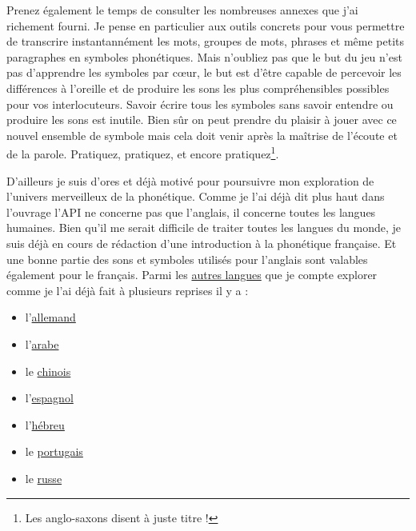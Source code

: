 Prenez également le temps de consulter les nombreuses annexes que j'ai
richement fourni. Je pense en particulier aux outils concrets pour
vous permettre de transcrire instantannément les mots, groupes de
mots, phrases et même petits paragraphes en symboles phonétiques. Mais
n'oubliez pas que le but du jeu n'est pas d'apprendre les symboles par
c{\oe}ur, le but est d'être capable de percevoir les différences à
l'oreille et de produire les sons les plus compréhensibles possibles
pour vos interlocuteurs. Savoir écrire tous les symboles sans savoir
entendre ou produire les sons est inutile. Bien sûr on peut prendre du
plaisir à jouer avec ce nouvel ensemble de symbole mais cela doit
venir après la maîtrise de l'écoute et de la parole. Pratiquez,
pratiquez, et encore pratiquez\footnote{Les anglo-saxons disent
   à juste titre !}. 

D'ailleurs je suis d'ores et déjà motivé pour poursuivre mon
exploration de l'univers merveilleux de la phonétique. Comme je l'ai
déjà dit plus haut dans l'ouvrage l'API ne concerne pas que l'anglais,
il concerne toutes les langues humaines. Bien qu'il me serait
difficile de traiter toutes les langues du monde, je suis déjà en
cours de rédaction d'une introduction à la phonétique française. Et
une bonne partie des sons et symboles utilisés pour l'anglais sont
valables également pour le français. Parmi les
\href{https://www.youtube.com/playlist?list=PLfKvL-VUSKAnkBk88BAb3oq1MlGVnhwcY}{autres
  langues} que je compte explorer comme je l'ai déjà fait à plusieurs
reprises il y a :
\begin{itemize}
  \item  l'\href{https://www.youtube.com/playlist?list=PLfKvL-VUSKAnM9MWJT9F1z1QZTdb73i7r}{allemand}
  \item
    l'\href{https://www.youtube.com/playlist?list=PLfKvL-VUSKAkXu2x3Fp74QxxYUVP43haA}{arabe}
  \item le
    \href{https://www.youtube.com/playlist?list=PLfKvL-VUSKAl4R0Mh7sKvQjqCsiEEa6D9}{chinois}
  \item
    l'\href{https://www.youtube.com/playlist?list=PLfKvL-VUSKAm_p6ikI_pTbxNuHco73REt}{espagnol}
  \item
    l'\href{https://www.youtube.com/playlist?list=PLfKvL-VUSKAkbDhpbtXc7RdroMBBeTJx0}{hébreu}
  \item le
    \href{https://www.youtube.com/playlist?list=PLfKvL-VUSKAn0zUUPYsMDd8_1J_UtfRxh}{portugais}
  \item le \href{https://www.youtube.com/playlist?list=PLfKvL-VUSKAk0YrJ3rV6cBj-w6rNCeOJB}{russe}
  \end{itemize}

